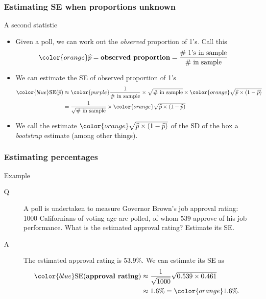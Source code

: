 \documentclass[handout]{beamer}
\begin{document}

   \begin{frame} \frametitle{Estimating SE when proportions unknown}

   \begin{block}
   {A second statistic}
   \begin{itemize}
   \item Given a poll, we can work out the {\em observed}
   proportion of 1's. Call this
   $$
   {\color{orange} \widehat{p}} = \text{\bf observed proportion} = \frac{\text{\# 1's in sample}}{\text{\# in sample}}
   $$
   \item We can estimate the SE of observed proportion of 1's
   $$
   \begin{aligned}
   {\color{blue} \text{SE}(\widehat{p})}& \approx {\color{purple} \frac{1}{\text{\# in sample}}}  \times  \sqrt{\text{\# in sample}} \times
   {\color{orange} \sqrt{\widehat{p} \times (1 - \widehat{p})}} \\
   & = \frac{1}{\sqrt{\text{\# in sample}}} \times
   {\color{orange} \sqrt{\widehat{p} \times (1 - \widehat{p})}} \\
   \end{aligned}
   $$

   \item We call the estimate ${\color{orange} \sqrt{\widehat{p} \times (1 - \widehat{p})}}$ of the SD of the box a {\color{orange} {\em bootstrap}} estimate (among other things).

   \end{itemize}
   \end{block}
   \end{frame}


   \begin{frame} \frametitle{Estimating percentages}

   \begin{block}
   {Example}
   \begin{description}
   \item[Q] A poll is undertaken to measure
   Governor Brown's job approval rating: 1000 Californians
   of voting age are polled, of whom 539 approve of his job performance.
   What is the estimated approval rating? Estimate its SE.

   \item[A] The estimated approval rating is 53.9\%. We can estimate
   its SE as
   $$
   \begin{aligned}
   {\color{blue} \text{SE({\bf approval rating})}} & \approx \frac{1}{\sqrt{1000}} \sqrt{0.539 \times 0.461} \\
   & \approx 1.6 \% = {\color{orange} 1.6\%}.
   \end{aligned}
   $$

   \end{description}
   \end{block}
   \end{frame}
\end{document}
